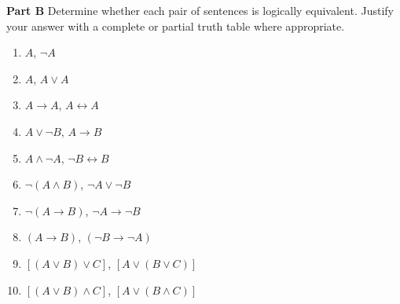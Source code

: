 \documentclass[12pt, letterpaper, twoside]{article}
\begin{document}
\noindent \textbf{Part B} Determine whether each pair of
sentences is logically equivalent. Justify your answer with
a complete or partial truth table where appropriate.
\begin{enumerate}
	\item $A$, $\neg A$
	\item $A$, $A \vee A$
	\item $A\rightarrow A$, $A \leftrightarrow A$
	\item $A \vee \neg B$, $A\rightarrow B$
	\item $A \wedge \neg A$, $\neg B \leftrightarrow B$
	\item $\neg(A \wedge B)$, $\neg A \vee \neg B$
	\item $\neg(A \rightarrow B)$, $\neg A \rightarrow
          \neg B$
	\item $(A \rightarrow B)$, $(\neg B \rightarrow \neg
          A)$
	\item $[(A \vee B) \vee C]$, $[A \vee (B \vee C)]$
	\item $[(A \vee B) \wedge C]$, $[A \vee (B \wedge
          C)]$
\end{enumerate}
\end{document}

